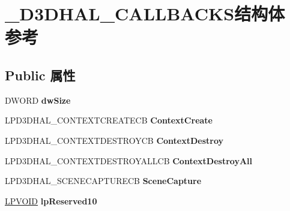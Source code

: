 \hypertarget{struct___d3_d_h_a_l___c_a_l_l_b_a_c_k_s}{}\section{\+\_\+\+D3\+D\+H\+A\+L\+\_\+\+C\+A\+L\+L\+B\+A\+C\+K\+S结构体 参考}
\label{struct___d3_d_h_a_l___c_a_l_l_b_a_c_k_s}
\subsection*{Public 属性}
\begin{DoxyCompactItemize}
\item 
\mbox{\label{struct___d3_d_h_a_l___c_a_l_l_b_a_c_k_s_a1fbe5e7ad44d9a2cb877454787e977fe}} 
D\+W\+O\+RD {\bfseries dw\+Size}
\item 
\mbox{\label{struct___d3_d_h_a_l___c_a_l_l_b_a_c_k_s_a0e58fe85827750275a9a6a0d3bf636c5}} 
L\+P\+D3\+D\+H\+A\+L\+\_\+\+C\+O\+N\+T\+E\+X\+T\+C\+R\+E\+A\+T\+E\+CB {\bfseries Context\+Create}
\item 
\mbox{\label{struct___d3_d_h_a_l___c_a_l_l_b_a_c_k_s_a58e7c4232889c761537240b5251b02a5}} 
L\+P\+D3\+D\+H\+A\+L\+\_\+\+C\+O\+N\+T\+E\+X\+T\+D\+E\+S\+T\+R\+O\+Y\+CB {\bfseries Context\+Destroy}
\item 
\mbox{\label{struct___d3_d_h_a_l___c_a_l_l_b_a_c_k_s_a218186f4380f5751b25a472f170e6761}} 
L\+P\+D3\+D\+H\+A\+L\+\_\+\+C\+O\+N\+T\+E\+X\+T\+D\+E\+S\+T\+R\+O\+Y\+A\+L\+L\+CB {\bfseries Context\+Destroy\+All}
\item 
\mbox{\label{struct___d3_d_h_a_l___c_a_l_l_b_a_c_k_s_ab71265dfe2fac2871a803fece5645c83}} 
L\+P\+D3\+D\+H\+A\+L\+\_\+\+S\+C\+E\+N\+E\+C\+A\+P\+T\+U\+R\+E\+CB {\bfseries Scene\+Capture}
\item 
\mbox{\label{struct___d3_d_h_a_l___c_a_l_l_b_a_c_k_s_a6b2fcdf39a5212aed7dcced9864a4b45}} 
\hyperlink{interfacevoid}{L\+P\+V\+O\+ID} {\bfseries lp\+Reserved10}
\item 

\end{DoxyCompactItemize}
